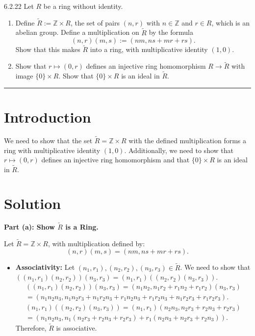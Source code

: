 \documentclass[12pt]{amsart}
\theoremstyle{definition}
\numberwithin{equation}{section}
\newcommand{\Z}{\mathbb{Z}}
\begin{document}
\begin{exercise}{6.2.22} Let \(R\) be a ring without identity.
    \begin{enumerate}[label=\textbf{\alph*.}]
        \item Define \(\tilde{R}:=\Z \times R\), the set of pairs \((n,r)\) with \(n \in \Z \) and \(r \in R\), which is an abelian group. Define a multiplication on \(\tilde{R}\) by the formula \[(n,r)(m,s):=(nm,ns+mr+rs).\] Show that this makes \(\tilde{R}\) into a ring, with multiplicative identity \((1,0)\).
        \item Show that \(r \mapsto (0,r)\) defines an injective ring homomorphism \(R \rightarrow \tilde{R}\) with image \( \{0\} \times R\). Show that \( \{0\} \times R\) is an ideal in \(\tilde{R}\).
    \end{enumerate}

    \noindent\rule{\linewidth}{1pt}

    \section*{Introduction}
    We need to show that the set \(\tilde{R} = \Z \times R\) with the defined multiplication forms a ring with multiplicative identity \((1,0)\). Additionally, we need to show that \(r \mapsto (0,r)\) defines an injective ring homomorphism and that \( \{ 0\} \times R\) is an ideal in \(\tilde{R}\).

    \section*{Solution}
    \noindent \textbf{Part (a): Show \(\tilde{R}\) is a Ring.}

    Let \(\tilde{R} = \Z \times R\), with multiplication defined by:
    \[
    (n,r)(m,s) = (nm, ns + mr + rs).
    \]

    \begin{itemize}
        \item \textbf{Associativity:}
        Let \((n_1, r_1), (n_2, r_2), (n_3, r_3) \in \tilde{R}\). We need to show that \(( (n_1, r_1) (n_2, r_2) ) (n_3, r_3) = (n_1, r_1) ( (n_2, r_2) (n_3, r_3) )\).
        \begin{multline*}
            ((n_1, r_1) (n_2, r_2))(n_3, r_3) = (n_1 n_2, n_1 r_2 + r_1 n_2 + r_1 r_2) (n_3, r_3) \\ = (n_1 n_2 n_3, n_1 n_2 r_3 + n_1 r_2 n_3 + r_1 n_2 n_3 + r_1 r_2 n_3 + n_1 r_2 r_3 + r_1 r_2 r_3).
        \end{multline*}
        \begin{multline*}
            (n_1, r_1) ((n_2, r_2) (n_3, r_3)) = (n_1, r_1) (n_2 n_3, n_2 r_3 + r_2 n_3 + r_2 r_3) \\ = (n_1 n_2 n_3, n_1 (n_2 r_3 + r_2 n_3 + r_2 r_3) + r_1 (n_2 n_3 + n_2 r_3 + r_2 n_3)).
        \end{multline*}
        Therefore, \(\tilde{R}\) is associative.


\end{itemize}
\end{exercise}
\end{document}
